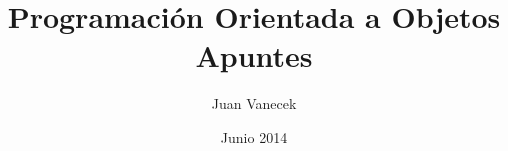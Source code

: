 \title{Programaci\'on Orientada a Objetos \\ Apuntes}
\date{Junio 2014}
\author{Juan Vanecek}
\begin{titlepage}
 \maketitle
\end{titlepage}